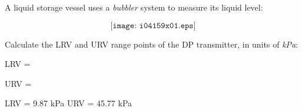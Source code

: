 

A liquid storage vessel uses a {\it bubbler} system to measure its liquid level:

$$\texttt{[image: i04159x01.eps]}$$

Calculate the LRV and URV range points of the DP transmitter, in units of {\it kPa}:

\vskip 10pt

LRV = \underbar{\hskip 50pt}

\vskip 10pt

URV = \underbar{\hskip 50pt}

\vskip 10pt







LRV = 9.87 kPa \hskip 50pt URV = 45.77 kPa











